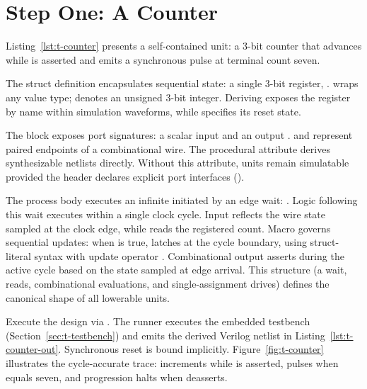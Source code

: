 \documentclass[journal,9pt]{IEEEtran}
\begin{document}
\section{Step One: A Counter}
\label{sec:t-counter}

Listing~\ref{lst:t-counter} presents a self-contained unit: a 3-bit counter that
advances while  is asserted and emits a synchronous 
pulse at terminal count seven.



The struct definition encapsulates sequential state: a single 3-bit register,
.  wraps any value type;  denotes an unsigned
3-bit integer. Deriving  exposes the register by name within
simulation waveforms, while  specifies its reset state.

The  block exposes port signatures: a scalar input  and an output .  and 
represent paired endpoints of a combinational wire. The \code{\#[lower]}
procedural attribute derives synthesizable netlists directly. Without this
attribute, units remain simulatable provided the header declares explicit port
interfaces ().

The process body executes an infinite  initiated by an edge wait:
. Logic following this wait executes within a
single clock cycle. Input  reflects the wire state sampled at
the clock edge, while  reads the registered count. Macro
 governs sequential updates: when  is true, 
latches  at the cycle boundary, using struct-literal syntax with
update operator \code{<=}. Combinational output  asserts during
the active cycle based on the state sampled at edge arrival. This
structure (a wait, reads, combinational evaluations, and single-assignment
drives) defines the canonical shape of all lowerable units.

Execute the design via . The runner
executes the embedded testbench (Section~\ref{sec:t-testbench}) and emits the
derived Verilog netlist in Listing~\ref{lst:t-counter-out}. Synchronous reset
 is bound implicitly. Figure~\ref{fig:t-counter} illustrates the
cycle-accurate trace:  increments while  is asserted,
 pulses when  equals seven, and progression halts when
 deasserts.
\end{document}
